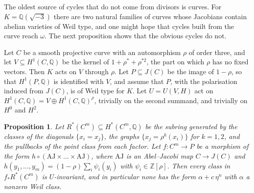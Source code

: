 \documentclass[11pt]{amsart}
\newtheorem{proposition}[theorem]{Proposition}
\theoremstyle{definition}
\theoremstyle{remark}
\newcommand{\QQ}{\mathbb{Q}}
\newcommand{\ZZ}{\mathbb{Z}}
\begin{document}
The oldest source of cycles that do not come from divisors is curves. For
$K=\QQ(\sqrt{-3})$ there are two natural families of curves whose
Jacobians contain abelian varieties of Weil type, and one might hope that
cycles built from the curve reach $\omega$. The next proposition shows that
the obvious cycles do not.

Let $C$ be a smooth projective curve with an automorphism $\rho$ of order
three, and let $V\subseteq H^{1}(C,\QQ)$ be the kernel of
$1+\rho^{*}+\rho^{*2}$, the part on which $\rho$ has no fixed vectors. Then
$K$ acts on $V$ through $\rho$. Let $P\subseteq J(C)$ be the image of
$1-\rho$, so that $H^{1}(P,\QQ)$ is identified with $V$, and assume that
$P$, with the polarisation induced from $J(C)$, is of Weil type for $K$.
Let $U=U(V,H)$ act on $H^{1}(C,\QQ)=V\oplus H^{1}(C,\QQ)^{\rho}$, trivially
on the second summand, and trivially on $H^{0}$ and $H^{2}$.

\begin{proposition}\label{prop:curves}
Let $R^{*}(C^{m})\subseteq H^{*}(C^{m},\QQ)$ be the subring generated by
the classes of the diagonals $\{x_{i}=x_{j}\}$, the graphs
$\{x_{j}=\rho^{k}(x_{i})\}$ for $k=1,2$, and the pullbacks of the point
class from each factor. Let $f\colon C^{m}\to P$ be a morphism of the form
$h\circ(\mathrm{AJ}\times\dots\times\mathrm{AJ})$, where $\mathrm{AJ}$ is an
Abel--Jacobi map $C\to J(C)$ and
$h(y_{1},\dots,y_{m})=(1-\rho)\sum_{i}\psi_{i}(y_{i})$ with
$\psi_{i}\in\ZZ[\rho]$. Then every class in $f_{*}R^{*}(C^{m})$ is
$U$-invariant, and in particular none has the form $\alpha+c\,\eta^{n}$
with $\alpha$ a nonzero Weil class.
\end{proposition}
\end{document}
